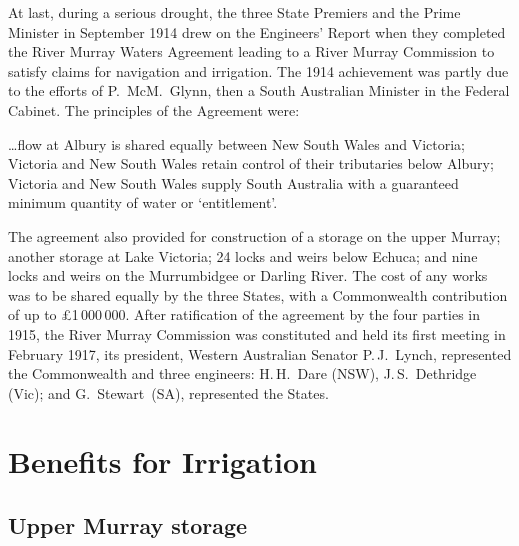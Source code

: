At last, during a serious drought, the three State
Premiers and the Prime Minister in September 1914 drew on the
Engineers' Report when they completed the River Murray Waters
Agreement leading to a River Murray Commission  to satisfy claims for navigation and irrigation. The 1914
achievement was partly due to the efforts of P.~McM.~Glynn,
 then a South Australian Minister in the
Federal Cabinet. The principles
of the Agreement were:
\begin{Quote}
	\ldots flow at Albury  is shared equally
	between New South Wales and Victoria; Victoria and New South
	Wales retain control of their tributaries below Albury;
	Victoria and New South Wales supply South Australia with a
	guaranteed minimum quantity of water or
	`entitlement'.
\end{Quote}

The agreement also provided for construction of a storage on the upper
Murray; another storage at Lake Victoria;  24
locks and weirs below Echuca;  and nine locks and
weirs on the Murrumbidgee or Darling River. 
 The cost of any works was to be shared
equally by the three States, with a Commonwealth contribution of up to
\pounds1\,000\,000. After ratification of the agreement by the four
parties in 1915, the River Murray Commission was constituted and held
its first meeting in February 1917, its president, Western Australian
Senator P.\,J.~Lynch,
  represented the Commonwealth and three
engineers: H.\,H.~Dare (NSW),   J.\,S.~Dethridge
(Vic);  and G.~Stewart~(SA),   represented the States.

\section*{Benefits for Irrigation}

\subsection*{Upper Murray storage}

